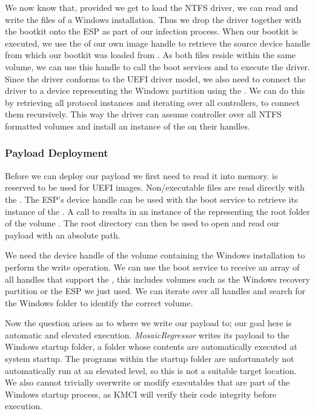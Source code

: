 We now know that, provided we get to load the \ac{NTFS} driver, we can read and write the files of a Windows installation.
Thus we drop the driver together with the bootkit onto the \ac{ESP} as part of our infection process.
When our bootkit is executed, we use the  of our own image handle to retrieve the source device handle from which our bootkit was loaded from \cite[Section 9.1]{uefi-spec}.
As both files reside within the same volume, we can use this handle to call the boot services  and  to execute the driver.
Since the driver conforms to the \ac{UEFI} driver model, we also need to connect the driver to a device representing the Windows partition using the .
We can do this by retrieving all protocol instances and iterating over all controllers, to connect them recursively.
This way the driver can assume controller over all \ac{NTFS} formatted volumes and install an instance of the  on their handles.

\subsubsection{Payload Deployment}

Before we can deploy our payload we first need to read it into memory.
 is reserved to be used for \ac{UEFI} images.
Non\-/executable files are read directly with the .
The \ac{ESP}'s device handle can be used with the boot service  to retrieve its instance of the .
A call to  results in an instance of the  representing the root folder of the volume \cite[Section 13.4]{uefi-spec}.
The root directory can then be used to open and read our payload with an absolute path.

We need the device handle of the volume containing the Windows installation to perform the write operation.
We can use the boot service  to receive an array of all handles that support the , this includes volumes such as the Windows recovery partition or the \ac{ESP} we just used.
We can iterate over all handles and search for the Windows folder to identify the correct volume.

Now the question arises as to where we write our payload to; our goal here is automatic and elevated execution.
\emph{MosaicRegressor} writes its payload to the Windows startup folder, a folder whose contents are automatically executed at system startup.
The programs within the startup folder are unfortunately not automatically run at an elevated level, so this is not a suitable target location.
We also cannot trivially overwrite or modify executables that are part of the Windows startup process, as \ac{KMCI} will verify their code integrity before execution.

